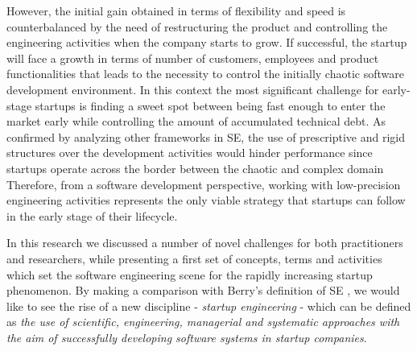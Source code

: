 \documentclass[10pt,journal,letterpaper,compsoc]{IEEEtran}
\begin{document}
However, the initial gain obtained in terms of flexibility and speed is counterbalanced by the need of restructuring the product and controlling the engineering activities when the company starts to grow. If successful, the startup will face a growth in terms of number of customers, employees and product functionalities that leads to the necessity to control the initially chaotic software development environment. In this context the most significant challenge for early-stage startups is finding a sweet spot between being fast enough to enter the market early while controlling the amount of accumulated technical debt.  As confirmed by analyzing other frameworks in SE, the use of prescriptive and rigid structures over the development activities would hinder performance since startups operate across the border between the chaotic and complex domain %
Therefore, from a software development perspective, working with low-precision engineering activities represents the only viable strategy that startups can follow in the early stage of their lifecycle.

In this research we discussed a number of novel challenges for both practitioners and researchers, while presenting a first set of concepts, terms and activities which set the software engineering scene for the rapidly increasing startup phenomenon. By making a comparison with Berry's definition of SE \cite{Berry1992}, we would like to see the rise of a new discipline - \textit{startup engineering} - which can be defined as  \textit{the use of scientific, engineering, managerial and systematic approaches with the aim of successfully developing software systems in startup companies}. %


%
\end{document}
